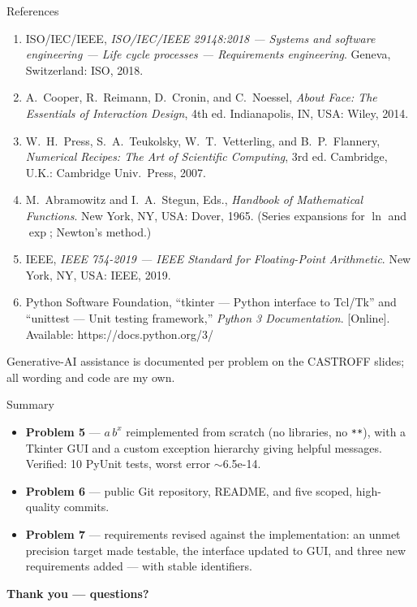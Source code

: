 \documentclass[10pt,aspectratio=169]{beamer}
\begin{document}
\begin{frame}{References}
  \footnotesize
  \begin{enumerate}\setlength\itemsep{0.35em}
    \item[{[1]}] ISO/IEC/IEEE, \textit{ISO/IEC/IEEE 29148:2018 --- Systems and software engineering --- Life cycle processes --- Requirements engineering}. Geneva, Switzerland: ISO, 2018.
    \item[{[2]}] A.~Cooper, R.~Reimann, D.~Cronin, and C.~Noessel, \textit{About Face: The Essentials of Interaction Design}, 4th ed. Indianapolis, IN, USA: Wiley, 2014.
    \item[{[3]}] W.~H.~Press, S.~A.~Teukolsky, W.~T.~Vetterling, and B.~P.~Flannery, \textit{Numerical Recipes: The Art of Scientific Computing}, 3rd ed. Cambridge, U.K.: Cambridge Univ.\ Press, 2007.
    \item[{[4]}] M.~Abramowitz and I.~A.~Stegun, Eds., \textit{Handbook of Mathematical Functions}. New York, NY, USA: Dover, 1965. (Series expansions for $\ln$ and $\exp$; Newton's method.)
    \item[{[5]}] IEEE, \textit{IEEE 754-2019 --- IEEE Standard for Floating-Point Arithmetic}. New York, NY, USA: IEEE, 2019.
    \item[{[6]}] Python Software Foundation, ``tkinter --- Python interface to Tcl/Tk'' and ``unittest --- Unit testing framework,'' \textit{Python 3 Documentation}. [Online]. Available: https://docs.python.org/3/
  \end{enumerate}
  \vspace{0.3em}
  \footnotesize\textcolor{mLightTeal}{Generative-AI assistance is documented per problem on the CASTROFF slides; all wording and code are my own.}
\end{frame}

\begin{frame}{Summary}
  \small
  \begin{itemize}\setlength\itemsep{0.35em}
    \item \textbf{Problem 5} --- $a\,b^{x}$ reimplemented from scratch (no libraries, no \texttt{**}), with a Tkinter GUI and a custom exception hierarchy giving helpful messages. Verified: 10 PyUnit tests, worst error $\sim$6.5e-14.
    \item \textbf{Problem 6} --- public Git repository, README, and five scoped, high-quality commits.
    \item \textbf{Problem 7} --- requirements revised against the implementation: an unmet precision target made testable, the interface updated to GUI, and three new requirements added --- with stable identifiers.
  \end{itemize}
  \vspace{0.6em}
  \centering\textcolor{mDarkTeal}{\textbf{Thank you --- questions?}}
\end{frame}
\end{document}
